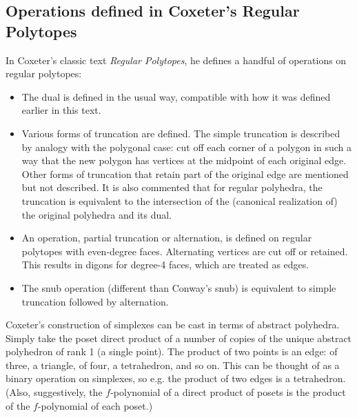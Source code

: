 \documentclass{amsart}[12pt]
\begin{document}
\subsection{Operations defined in Coxeter's Regular Polytopes}

In Coxeter's classic text \textit{Regular Polytopes}\cite{coxeter73},
he defines a handful of operations on regular polytopes:
\begin{itemize}
  \item The dual is defined in the usual way, compatible with how it was
  defined earlier in this text.
  \item Various forms of truncation are defined. The simple truncation is
  described by analogy with the polygonal case: cut off each corner of a
  polygon in such a way that the new polygon has vertices at the midpoint of
  each original edge. Other forms of truncation that retain part of the original
  edge are mentioned but not described. It is also commented that for regular
  polyhedra, the truncation is equivalent to the intersection
  of the (canonical realization of) the original polyhedra and its dual.
  \item An operation, partial truncation or alternation, is defined on regular
  polytopes with even-degree faces. Alternating vertices are cut off or
  retained. This results in digons for degree-4 faces,
  which are treated as edges.
  \item The snub operation (different than Conway's snub)
  is equivalent to simple truncation followed by alternation.
\end{itemize}

Coxeter's construction of simplexes can be cast in terms of abstract polyhedra.
Simply take the poset direct product of a number of copies of the unique
abstract polyhedron of rank 1 (a single point). The product of two points is an
edge: of three, a triangle, of four, a tetrahedron, and so on. This can be
thought of as a binary operation on simplexes, so e.g. the product of two edges
is a tetrahedron. (Also, suggestively, the $f$-polynomial of a direct product
of posets is the product of the $f$-polynomial of each poset.)
\end{document}
